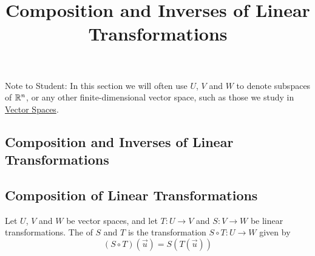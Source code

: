 \documentclass{ximera}
\title{Composition and Inverses of Linear Transformations} \license{CC BY-NC-SA 4.0}
\begin{document}
\begin{abstract}
 
\end{abstract}
\maketitle

Note to Student:  In this section we will often use $U$, $V$ and $W$ to denote subspaces of $\mathbb{R}^n$, or any other finite-dimensional vector space, such as those we study in \href{https://ximera.osu.edu/oerlinalg/LinearAlgebra/XLAChapter_vecSpaces/main}{Vector Spaces}. 

\begin{onlineOnly}
\section*{Composition and Inverses of Linear Transformations}
\end{onlineOnly}

\subsection*{Composition of Linear Transformations}
\begin{definition}\label{def:compoflintrans} Let $U$, $V$ and $W$ be vector spaces, and let $T:U\rightarrow V$ and $S:V\rightarrow W$ be linear transformations.  The  of $S$ and $T$ is the transformation $S\circ T:U\rightarrow W$ given by
$$(S\circ T)(\vec{u})=S(T(\vec{u}))$$
\end{definition}
\end{document}
